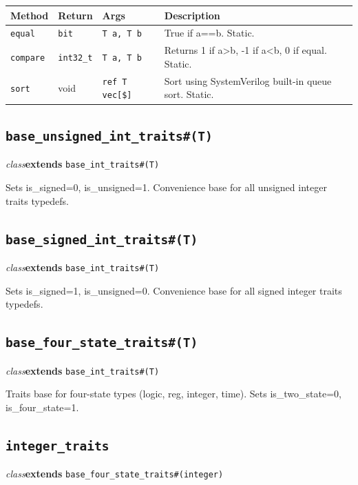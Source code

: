 \documentclass[11pt,letterpaper]{report}
\begin{document}
\begin{xltabular}{\linewidth}{>{\small}p{1.35in} >{\small}p{1.25in} >{\small}p{0.95in} >{\small}X}
\toprule
\textbf{Method} & \textbf{Return} & \textbf{Args} & \textbf{Description} \\
\midrule
\endhead
\bottomrule
\endfoot
\texttt{equal} & \texttt{bit} & \texttt{T a, T b} & True if a==b. Static. \\
\texttt{compare} & \texttt{int32\_t} & \texttt{T a, T b} & Returns 1 if a\textgreater{}b, -1 if a\textless{}b, 0 if equal. Static. \\
\texttt{sort} & void & \texttt{ref T vec[\$]} & Sort using SystemVerilog built-in queue sort. Static. \\
\end{xltabular}

\subsection*{\texttt{base\_unsigned\_int\_traits\#(T)}}
\noindent\small\textit{class}\quad \textbf{extends} \texttt{base\_int\_traits\#(T)}\par

Sets is\_signed=0, is\_unsigned=1. Convenience base for all unsigned integer traits typedefs.


\subsection*{\texttt{base\_signed\_int\_traits\#(T)}}
\noindent\small\textit{class}\quad \textbf{extends} \texttt{base\_int\_traits\#(T)}\par

Sets is\_signed=1, is\_unsigned=0. Convenience base for all signed integer traits typedefs.


\subsection*{\texttt{base\_four\_state\_traits\#(T)}}
\noindent\small\textit{class}\quad \textbf{extends} \texttt{base\_int\_traits\#(T)}\par

Traits base for four-state types (logic, reg, integer, time). Sets is\_two\_state=0, is\_four\_state=1.


\subsection*{\texttt{integer\_traits}}
\noindent\small\textit{class}\quad \textbf{extends} \texttt{base\_four\_state\_traits\#(integer)}\par
\end{document}
